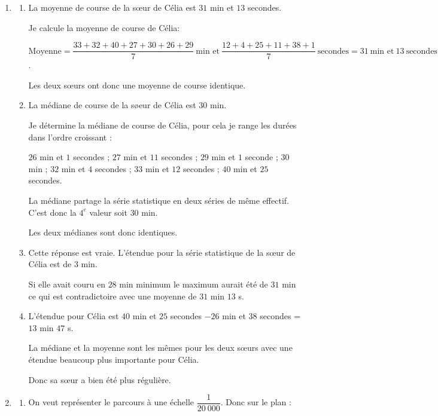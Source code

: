 \begin{enumerate}
    \item
    \begin{enumerate}
        \item %
        La moyenne de course de la s\oe ur de Célia est $31$ min et $13$ secondes.

        Je calcule la moyenne de course de Célia:

        $\text{Moyenne} = \dfrac{33+32+40+27+30+26+29}{7}~\text{min et}~\dfrac{12+4+25+11+38+1}{7}~\text{secondes}=31~\text{min et}~13~\text{secondes}$.

        Les deux s\oe urs ont donc une moyenne de course identique.


        \item La médiane de course de la s\o eur de Célia est $30$ min.

        Je détermine la médiane de course de Célia, pour cela je range les durées dans l’ordre croissant :

        $26$ min et $1$ secondes ; $27$ min et $11$ secondes ; $29$ min et $1$ seconde ; $30$ min ; $32$ min et $4$ secondes ; $33$ min et $12$ secondes ; $40$ min et $25$ secondes.

        La médiane partage la série statistique en deux séries de même effectif. C’est donc la $4^e$ valeur soit $30$ min.

        Les deux médianes sont donc identiques.
        \item Cette réponse est vraie. L'étendue pour la série statistique de la s\oe ur de Célia est de $3$ min.

        Si elle avait couru en $28$ min minimum le maximum aurait été de $31$ min ce qui est contradictoire avec une moyenne de $31$ min $13$ s.
        \item L'étendue pour Célia est $40$ min et $25$ secondes $- 26$ min et $38$ secondes = $13$ min $47$ s.

        La médiane et la moyenne sont les mêmes pour les deux s\oe urs avec une étendue beaucoup plus importante pour Célia.

        \medskip
        Donc sa s\oe ur a bien été plus régulière.
    \end{enumerate}
    \item
    \begin{enumerate}
        \item On veut représenter le parcours à une échelle $\dfrac{1}{20~000}$. Donc sur le plan :


\end{enumerate}
\end{enumerate}
